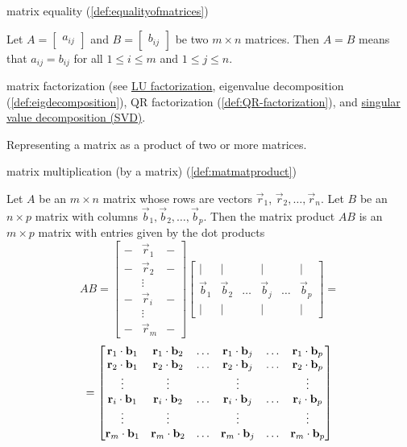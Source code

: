 \documentclass{ximera}
\begin{document}
matrix equality (\ref{def:equalityofmatrices})
\begin{expandable}{}{}
    Let $A=\begin{bmatrix} a_{ij}\end{bmatrix}$ and $B=\begin{bmatrix} b_{ij}\end{bmatrix}$ be two $m \times n$ matrices. Then $A=B$ means
that $a_{ij}=b_{ij}$ for all $1\leq i\leq m$ and 
$1\leq j\leq n$.
\end{expandable}

matrix factorization (see \href{https://ximera.osu.edu/linearalgebradzv3/LinearAlgebraInteractiveIntro/MAT-0070/main}{LU factorization}, eigenvalue decomposition (\ref{def:eigdecomposition}), QR factorization (\ref{def:QR-factorization}), and \href{https://ximera.osu.edu/linearalgebradzv3/LinearAlgebraInteractiveIntro/RTH-0060/main}{singular value decomposition (SVD)}. 
\begin{expandable}{}{}
    Representing a matrix as a product of two or more matrices.
\end{expandable}

matrix multiplication (by a matrix) (\ref{def:matmatproduct})
\begin{expandable}{}{}
    Let $A$ be an $m\times n$ matrix whose rows are vectors $\vec{r}_1$, $\vec{r}_2,\ldots ,\vec{r}_n$.  Let $B$ be an $n\times p$ matrix with columns $\vec{b}_1, \vec{b}_2, \ldots, \vec{b}_p$.  Then the matrix product $AB$ is an $m \times p$ matrix with entries given by the dot products
$$AB=\begin{bmatrix}-&\vec{r}_1&-\\-&\vec{r}_2&-\\ &\vdots & \\-&\vec{r}_i &-\\ &\vdots& \\-&\vec{r}_m&-\end{bmatrix}\begin{bmatrix}|&|&&|&&|\\\vec{b}_1& \vec{b}_2 &\ldots  & \vec{b}_j&\ldots& \vec{b}_p\\|&|&&|&&|\end{bmatrix}=$$
$$=\begin{bmatrix}\mathbf{r}_1\cdot \mathbf{b}_1&\mathbf{r}_1\cdot \mathbf{b}_2&\ldots&\mathbf{r}_1\cdot \mathbf{b}_j&\ldots &\mathbf{r}_1\cdot \mathbf{b}_p\\\mathbf{r}_2\cdot \mathbf{b}_1&\mathbf{r}_2\cdot \mathbf{b}_2&\ldots&\mathbf{r}_2\cdot \mathbf{b}_j&\ldots &\mathbf{r}_2\cdot \mathbf{b}_p\\\vdots&\vdots&&\vdots&&\vdots\\\mathbf{r}_i\cdot \mathbf{b}_1&\mathbf{r}_i\cdot \mathbf{b}_2&\ldots&\mathbf{r}_i\cdot \mathbf{b}_j&\ldots &\mathbf{r}_i\cdot \mathbf{b}_p\\\vdots&\vdots&&\vdots&&\vdots\\\mathbf{r}_m\cdot \mathbf{b}_1&\mathbf{r}_m\cdot \mathbf{b}_2&\ldots&\mathbf{r}_m\cdot \mathbf{b}_j&\ldots &\mathbf{r}_m\cdot \mathbf{b}_p\end{bmatrix}
$$
\end{expandable}
\end{document}
